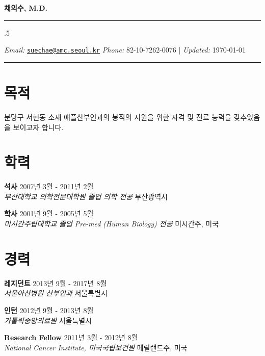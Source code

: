 \documentclass[12pt,]{article}
\begin{document}
\centerline{\huge \bf 채의수, M.D.}

\vspace{2 mm}

\hrule

\vspace{2 mm}



\moveleft.5\hoffset\centerline{ \emph{Email:} \href{mailto:}{\href{mailto:suechae@amc.seoul.kr}{\nolinkurl{suechae@amc.seoul.kr}}} \hspace{1 mm} \emph{Phone:}  82-10-7262-0076  \hspace{1 mm}       | \emph{Updated:} \today}

\vspace{2 mm}

\hrule


\section{목적}

분당구 서현동 소재 애플산부인과의 봉직의 지원을 위한 자격 및 진료 능력을
갖추었음을 보이고자 합니다.

\section{학력}

\textbf{석사} \hfill 2007년 3월 - 2011년 2월\\
\emph{부산대학교 의학전문대학원 졸업 \textbar{} 의학 전공}
\hfill 부산광역시

\textbf{학사} \hfill 2001년 9월 - 2005년 5월\\
\emph{미시간주립대학교 졸업 \textbar{} Pre-med (Human Biology) 전공}
\hfill 미시간주, 미국

\section{경력}

\textbf{레지던트} \hfill 2013년 9월 - 2017년 8월\\
\emph{서울아산병원 산부인과} \hfill 서울특별시

\textbf{인턴} \hfill 2012년 9월 - 2013년 8월\\
\emph{가톨릭중앙의료원} \hfill 서울특별시

\textbf{Research Fellow} \hfill 2011년 3월 - 2012년 8월\\
\emph{National Cancer Institute, 미국국립보건원} \hfill 메릴랜드주, 미국
\end{document}
